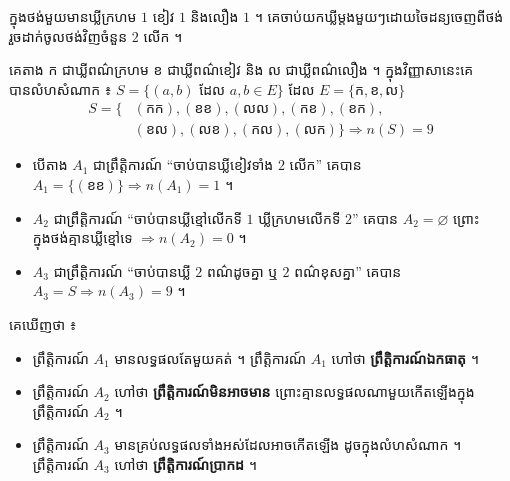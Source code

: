 \begin{example}[ឧទាហរណ៍ ២]
ក្នុងថង់មួយមានឃ្លីក្រហម $1$ ខៀវ $1$ និងលឿង $1$ ។ គេចាប់យកឃ្លីម្ដងមួយៗដោយចៃដន្យចេញពីថង់ រួចដាក់ចូលថង់វិញចំនួន $2$ លើក ។
\end{example}
គេតាង ក ជាឃ្លីពណ៌ក្រហម ខ ជាឃ្លីពណ៌ខៀវ និង ល ជាឃ្លីពណ៌លឿង ។ ក្នុងវិញ្ញាសានេះគេបានលំហសំណាក ៖ $S = \{(a, b)$ ដែល $a, b \in E\}$ ដែល $E = \{\text{ក}, \text{ខ}, \text{ល}\}$
\[
\begin{aligned}
S = \{&(\text{កក}), (\text{ខខ}), (\text{លល}), (\text{កខ}), (\text{ខក}),\\
&(\text{ខល}), (\text{លខ}), (\text{កល}), (\text{លក})\} \Rightarrow n(S) = 9
\end{aligned}
\]
\begin{itemize}
  \item បើតាង $A_1$ ជាព្រឹត្តិការណ៍ “ចាប់បានឃ្លីខៀវទាំង $2$ លើក” គេបាន $A_1 = \{(\text{ខខ})\} \Rightarrow n(A_1) = 1$ ។
  \item $A_2$ ជាព្រឹត្តិការណ៍ “ចាប់បានឃ្លីខ្មៅលើកទី $1$ ឃ្លីក្រហមលើកទី $2$” គេបាន $A_2 = \varnothing$ ព្រោះក្នុងថង់គ្មានឃ្លីខ្មៅទេ $\Rightarrow n(A_2) = 0$ ។
  \item $A_3$ ជាព្រឹត្តិការណ៍ “ចាប់បានឃ្លី $2$ ពណ៌ដូចគ្នា ឬ $2$ ពណ៌ខុសគ្នា” គេបាន $A_3 = S \Rightarrow n(A_3) = 9$ ។
\end{itemize}
គេឃើញថា ៖
\begin{itemize}
  \item ព្រឹត្តិការណ៍ $A_1$ មានលទ្ធផលតែមួយគត់ ។ ព្រឹត្តិការណ៍ $A_1$ ហៅថា \textbf{ព្រឹត្តិការណ៍ឯកធាតុ} ។
  \item ព្រឹត្តិការណ៍ $A_2$ ហៅថា \textbf{ព្រឹត្តិការណ៍មិនអាចមាន} ព្រោះគ្មានលទ្ធផលណាមួយកើតឡើងក្នុងព្រឹត្តិការណ៍ $A_2$ ។
  \item ព្រឹត្តិការណ៍ $A_3$ មានគ្រប់លទ្ធផលទាំងអស់ដែលអាចកើតឡើង ដូចក្នុងលំហសំណាក ។ ព្រឹត្តិការណ៍ $A_3$ ហៅថា \textbf{ព្រឹត្តិការណ៍ប្រាកដ} ។
\end{itemize}

